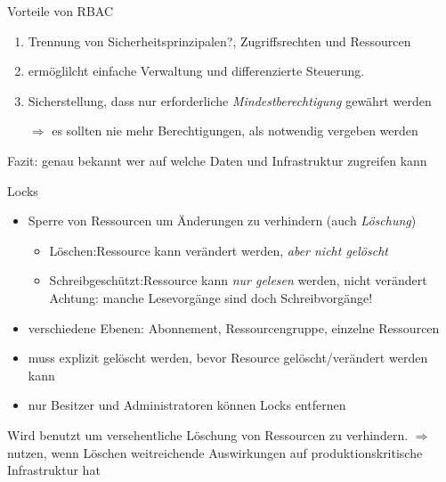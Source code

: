 \begin{flashcard}[]{Vorteile von RBAC}
    \begin{enumerate}
        \item Trennung von Sicherheitsprinzipalen?, Zugriffsrechten und Ressourcen
        \item ermöglilcht einfache Verwaltung und differenzierte Steuerung.
        \item Sicherstellung, dass nur erforderliche \emph{Mindestberechtigung} gewährt werden
        \item[$\Rightarrow$] es sollten nie mehr Berechtigungen, als notwendig vergeben werden
    \end{enumerate}
    Fazit: genau bekannt wer auf welche Daten und Infrastruktur zugreifen kann
\end{flashcard}

\begin{flashcard}[Describe]{Locks}
    \begin{itemize}
        \item Sperre von Ressourcen um Änderungen zu verhindern (auch \emph{Löschung})
        \begin{itemize}
            \item Löschen:\newline Ressource kann verändert werden, \emph{aber nicht gelöscht}
            \item Schreibgeschützt:\newline Ressource kann \emph{nur gelesen} werden, nicht verändert\newline
            Achtung: manche Lesevorgänge sind doch Schreibvorgänge!
        \end{itemize}
        \item verschiedene Ebenen: Abonnement, Ressourcengruppe, einzelne Ressourcen
        \item muss explizit gelöscht werden, bevor Resource gelöscht/verändert werden kann
        \item nur Besitzer und Administratoren können Locks entfernen
    \end{itemize}
    
    Wird benutzt um versehentliche Löschung von Ressourcen zu verhindern. \newline
    $\Rightarrow$ nutzen, wenn Löschen weitreichende Auswirkungen auf produktionskritische Infrastruktur hat

\end{flashcard}

